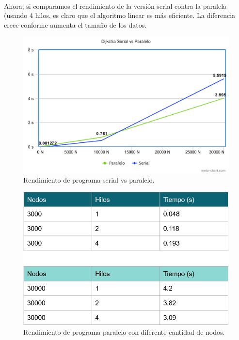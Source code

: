 \documentclass[11pt]{article}
\begin{document}
\paragraph{}
Ahora, si comparamos el rendimiento de la versión serial contra la paralela (usando 4 hilos, es claro que el algoritmo linear es más eficiente. La diferencia crece conforme aumenta el tamaño de los datos. 

\begin{figure}[!h]
\centering
\includegraphics[width=1\linewidth]{tablas.png}
  \caption{Rendimiento de programa serial vs paralelo.}
\end{figure}

\begin{figure}
\centering
\includegraphics[width=0.9\linewidth]{tablas1.png}
  \caption{Rendimiento de programa paralelo con diferente cantidad de nodos.}
\end{figure}
\end{document}

